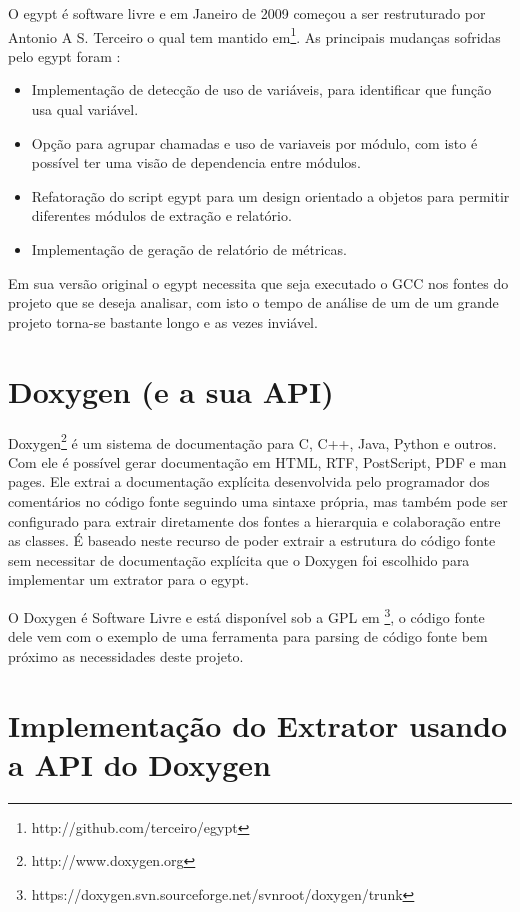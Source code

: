 O egypt é software livre e em Janeiro de 2009 começou a ser restruturado por Antonio A S. Terceiro o qual tem mantido em\footnote{http://github.com/terceiro/egypt}. As principais mudanças sofridas pelo egypt foram \cite{StructuralComplexityEvolution}:

\begin{itemize}
\item Implementação de detecção de uso de variáveis, para identificar que função usa qual variável.
\item Opção para agrupar chamadas e uso de variaveis por módulo, com isto é possível ter uma visão de dependencia entre módulos.
\item Refatoração do script egypt para um design orientado a objetos para permitir diferentes módulos de extração e relatório.
\item Implementação de geração de relatório de métricas.
\end{itemize}

Em sua versão original o egypt necessita que seja executado o GCC nos fontes do projeto que se deseja analisar, com isto o tempo de análise de um de um grande projeto torna-se bastante longo e as vezes inviável.

\section{Doxygen (e a sua API)}

Doxygen\footnote{http://www.doxygen.org} é um sistema de documentação para C, C++, Java, Python e outros. Com ele é possível gerar documentação em HTML, RTF, PostScript, PDF e man pages. Ele extrai a documentação explícita desenvolvida pelo programador dos comentários no código fonte seguindo uma sintaxe própria, mas também pode ser configurado para extrair diretamente dos fontes a hierarquia e colaboração entre as classes. É baseado neste recurso de poder extrair a estrutura do código fonte sem necessitar de documentação explícita que o Doxygen foi escolhido para implementar um extrator para o egypt.

O Doxygen é Software Livre e está disponível sob a GPL  em \footnote{https://doxygen.svn.sourceforge.net/svnroot/doxygen/trunk}, o código fonte dele vem com o exemplo de uma ferramenta para parsing de código fonte bem próximo as necessidades deste projeto.

\section{Implementação do Extrator usando a API do Doxygen}

